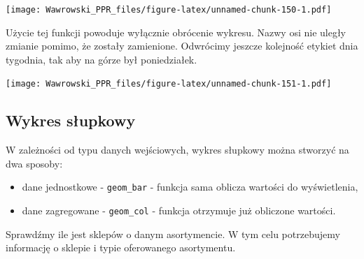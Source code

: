 \documentclass[]{book}
\newenvironment{Shaded}{\begin{snugshade}}{\end{snugshade}}
\newcommand{\KeywordTok}[1]{\textcolor[rgb]{0.13,0.29,0.53}{\textbf{#1}}}
\newcommand{\DataTypeTok}[1]{\textcolor[rgb]{0.13,0.29,0.53}{#1}}
\newcommand{\StringTok}[1]{\textcolor[rgb]{0.31,0.60,0.02}{#1}}
\newcommand{\OperatorTok}[1]{\textcolor[rgb]{0.81,0.36,0.00}{\textbf{#1}}}
\newcommand{\NormalTok}[1]{#1}
\providecommand{\tightlist}{%
  \setlength{\itemsep}{0pt}\setlength{\parskip}{0pt}}
\begin{document}
\texttt{[image: Wawrowski\_PPR\_files/figure-latex/unnamed-chunk-150-1.pdf]}

Użycie tej funkcji powoduje wyłącznie obrócenie wykresu. Nazwy osi nie
uległy zmianie pomimo, że zostały zamienione. Odwrócimy jeszcze
kolejność etykiet dnia tygodnia, tak aby na górze był poniedziałek.

\begin{Shaded}
\end{Shaded}

\texttt{[image: Wawrowski\_PPR\_files/figure-latex/unnamed-chunk-151-1.pdf]}

\subsection{Wykres słupkowy}\label{wykres-supkowy}

W zależności od typu danych wejściowych, wykres słupkowy można stworzyć
na dwa sposoby:

\begin{itemize}
\tightlist
\item
  dane jednostkowe - \texttt{geom\_bar} - funkcja sama oblicza wartości
  do wyświetlenia,
\item
  dane zagregowane - \texttt{geom\_col} - funkcja otrzymuje już
  obliczone wartości.
\end{itemize}

Sprawdźmy ile jest sklepów o danym asortymencie. W tym celu potrzebujemy
informację o sklepie i typie oferowanego asortymentu.

\begin{Shaded}
\end{Shaded}
\end{document}
